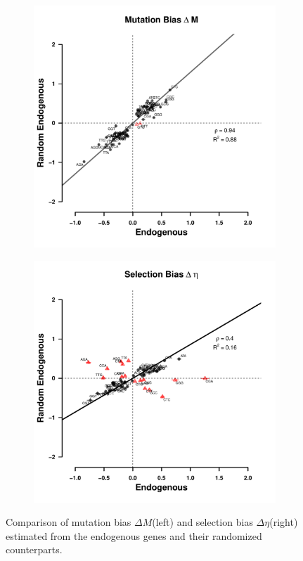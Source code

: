 \documentclass[doublespacing,linenumbers]{bmcart-modified}
\newcommand{\DM}{\ensuremath{{\Delta M}}\xspace}
\newcommand{\DE}{\ensuremath{{\Delta \eta}}\xspace}
\begin{document}
\begin{backmatter}
\begin{figure}
    \centering
    \begin{subfigure}
        \centering
        \includegraphics[width=.45\textwidth]{img/figS10a.pdf}
    \end{subfigure}
    \begin{subfigure}
        \centering
        \includegraphics[width=.45\textwidth]{img/figS10b.pdf}
    \end{subfigure}
    \caption{Comparison of mutation bias \DM (left) and selection bias \DE (right) estimated from the endogenous genes and their randomized counterparts. }
    \label{fig:rnd_endo}
\end{figure}
\null
\vfill



\end{backmatter}
\end{document}

